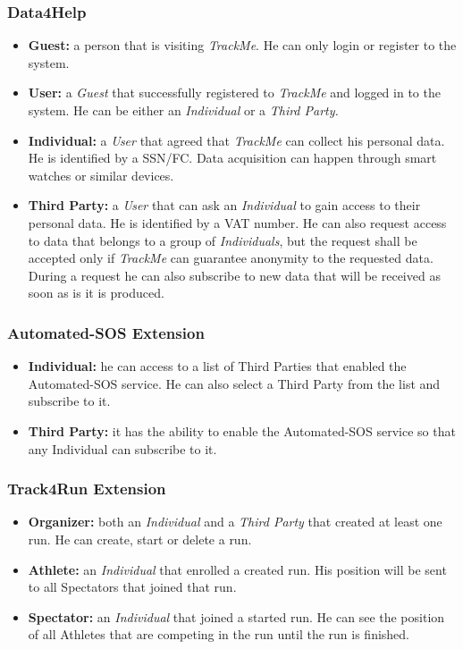 \documentclass[a4paper]{article}
\begin{document}
        \subsubsection{Data4Help}
        \begin{itemize}
            \item \textbf{Guest:} a person that is visiting \textit{TrackMe}. He can only login or register to the system.
            \item \textbf{User:} a \textit{Guest} that successfully registered to \textit{TrackMe} and logged in to the system. He can be either an \textit{Individual} or a \textit{Third Party.}
            \item \textbf{Individual:} a \textit{User} that agreed that \textit{TrackMe} can collect his personal data. He is identified by a SSN/FC. Data acquisition can happen through smart watches or similar devices.
            \item \textbf{Third Party:} a \textit{User} that can ask an \textit{Individual} to gain access to their personal data. He is identified by a VAT number. He can also request access to data that belongs to a group of \textit{Individuals}, but the request shall be accepted only if \textit{TrackMe} can guarantee anonymity to the requested data. During a request he can also subscribe to new data that will be received as soon as is it is produced.
        \end{itemize}

        \subsubsection{Automated-SOS Extension}
        \begin{itemize}
            \item \textbf{Individual:} he can access to a list of Third Parties that enabled the Automated-SOS service. He can also select a Third Party from the list and subscribe to it.
            \item \textbf{Third Party:} it has the ability to enable the Automated-SOS service so that any Individual can subscribe to it.
        \end{itemize}
        
        \subsubsection{Track4Run Extension}
        \begin{itemize}
            \item \textbf{Organizer:} both an \textit{Individual} and a \textit{Third Party} that created at least one run. He can create, start or delete a run.
            \item \textbf{Athlete:} an \textit{Individual} that enrolled a created run. His position will be sent to all Spectators that joined that run.
            \item \textbf{Spectator:} an \textit{Individual} that joined a started run. He can see the position of all Athletes that are competing in the run until the run is finished.
        \end{itemize}
        
\end{document}

